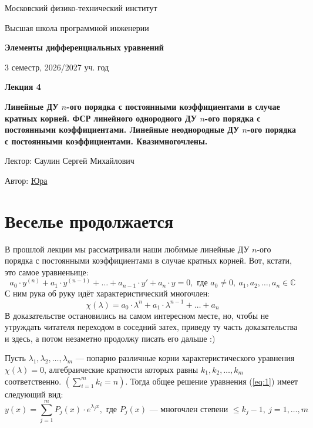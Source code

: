 \documentclass[11pt]{article}
\newcommand{\lectureNumber}{4}
\newcommand{\lectureTitle}{Линейные ДУ $n$-ого порядка с постоянными коэффициентами в случае кратных корней. ФСР линейного однородного ДУ $n$-ого порядка с постоянными коэффициентами. Линейные неоднородные ДУ $n$-ого порядка с постоянными коэффициентами. Квазимногочлены.}
\newcommand{\courseName}{Элементы дифференциальных уравнений}
\newcommand{\semester}{3 семестр, 2026/2027 уч. год}
\begin{document}
\begin{titlepage}
    \centering
    
    {\large Московский физико-технический институт \par}
    {\large Высшая школа программной инженерии \par}
    \vspace{2cm}

    {\Large \textbf{\courseName} \par}
    {\large \semester \par}
    
    \vspace*{\fill}

    {\Huge \textbf{Лекция \lectureNumber} \par}
    {\Huge \textbf{\lectureTitle} \par}
    
    \vspace*{\fill}
    
    {\large Лектор: Саулин Сергей Михайлович \par}
    {\large Автор: \href{https://t.me/ceagest}{Юра} \par}

\end{titlepage}


\section{Веселье продолжается}

В прошлой лекции мы рассматривали наши любимые линейные ДУ $n$-ого порядка с постоянными коэффициентами в случае кратных корней. Вот, кстати, это самое уравненьице:
\[a_0 \cdot y^{(n)} + a_1 \cdot y^{(n - 1)} + \dots + a_{n - 1} \cdot y' + a_n \cdot y = 0, \text{ где } a_0 \neq 0, \ a_1, a_2, \dots, a_n \in \mathbb{C} \tag{1} \label{eq:1}\]
С ним рука об руку идёт характеристический многочлен:
\[\chi(\lambda) = a_0 \cdot \lambda^n + a_1 \cdot \lambda^{n-1} + \dots + a_n \tag{2} \label{eq:2}\]
В доказательстве остановились на самом интересном месте, но, чтобы не утруждать читателя переходом в соседний затех, приведу ту часть доказательства и здесь, а потом незаметно продолжу писать его дальше :)

\begin{theorem}
    Пусть $\lambda_1, \lambda_2, \dots, \lambda_m$ --- попарно различные корни характеристического уравнения $\chi(\lambda) = 0$, алгебраические
    кратности которых равны $k_1, k_2, \dots, k_m$ соответственно. $\displaystyle \left(\sum_{i = 1}^{m} k_i = n\right)$. Тогда общее решение
    уравнения (\ref{eq:1}) имеет следующий вид: \[\tag{3} \label{eq:3} y(x) = \sum_{j = 1}^{m} P_j(x) \cdot e^{\lambda_j x}, \text{ где } P_j(x) 
    \text{ --- многочлен степени } \leq k_j - 1, \ j = 1, \dots, m\]
\end{theorem}
\end{document}
